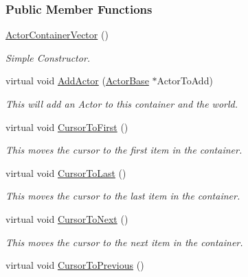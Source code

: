 \subsubsection*{Public Member Functions}
\begin{DoxyCompactItemize}
\item 
\hyperlink{classMezzanine_1_1ActorContainerVector_a20cb603431e4499c1c6d3c901493f224}{ActorContainerVector} ()
\begin{DoxyCompactList}\small\item\em Simple Constructor. \item\end{DoxyCompactList}\item 
virtual void \hyperlink{classMezzanine_1_1ActorContainerVector_a1341d51fa9ed279301eed579a2de79b2}{AddActor} (\hyperlink{classMezzanine_1_1ActorBase}{ActorBase} $\ast$ActorToAdd)
\begin{DoxyCompactList}\small\item\em This will add an Actor to this container and the world. \item\end{DoxyCompactList}\item 
virtual void \hyperlink{classMezzanine_1_1ActorContainerVector_a2b09e4eac9bc6392f47dd81fb7592ce3}{CursorToFirst} ()
\begin{DoxyCompactList}\small\item\em This moves the cursor to the first item in the container. \item\end{DoxyCompactList}\item 
virtual void \hyperlink{classMezzanine_1_1ActorContainerVector_ae80f9d94f009293528bf1b4251bc8ad0}{CursorToLast} ()
\begin{DoxyCompactList}\small\item\em This moves the cursor to the last item in the container. \item\end{DoxyCompactList}\item 
virtual void \hyperlink{classMezzanine_1_1ActorContainerVector_a04cce1784a09023cb9db8cbc60a60d0c}{CursorToNext} ()
\begin{DoxyCompactList}\small\item\em This moves the cursor to the next item in the container. \item\end{DoxyCompactList}\item 
virtual void \hyperlink{classMezzanine_1_1ActorContainerVector_abe0d1ce8c8f6a83a7ef3c340a605e767}{CursorToPrevious} ()

\end{DoxyCompactItemize}
